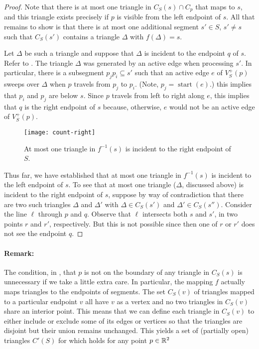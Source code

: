 \documentclass{patmorin}
\DeclareMathOperator{\start}{start}
\begin{document}
\begin{proof}
Note that there is at most one triangle in $C_S(s)\cap C_p$ that maps
to $s$, and this triangle exists precisely if $p$ is visible from the
left endpoint of $s$.  All that remains to show is that there is at
most one additional segment $s'\in S$, $s'\neq s$ such that $C_S(s')$
contains a triangle $\Delta$ with $f(\Delta)=s$.

Let $\Delta$ be such a triangle and suppose that $\Delta$ is incident to
the endpoint $q$ of $s$.  Refer to .  The triangle
$\Delta$ was generated by an active edge when processing $s'$.  In
particular, there is a subsegment $p_j p_i\subseteq s'$ such that an active
edge $e$ of $V^+_S(p)$ sweeps over $\Delta$ when $p$ travels from $p_j$ to
$p_i$. (Note, $p_j=\start(e)$.) this implies that $p_i$ and $p_j$ are below
$s$. Since $p$ travels from left to right along $e$, this implies that $q$
is the right endpoint of $s$ because, otherwise, $e$ would not be an active
edge of $V^+_S(p)$.

\begin{figure}
  \begin{center}
    \texttt{[image: count-right]}
  \end{center}
  \caption{At most one triangle in $f^{-1}(s)$ is incident to the right
           endpoint of $S$.}
\end{figure}

Thus far, we have established that at most one triangle in $f^{-1}(s)$ is
incident to the left endpoint of $s$.  To see that at most one triangle
($\Delta$, discussed above) is incident to the right endpoint of $s$,
suppose by way of contradiction that there are two such triangles $\Delta$
and $\Delta'$ with $\Delta\in C_S(s')$ and $\Delta'\in C_S(s'')$.
Consider the line $\ell$ through $p$ and $q$.  Observe that $\ell$
intersects both $s$ and $s'$, in two points $r$ and $r'$, respectively. But
this is not possible since then one of $r$ or $r'$ does not see the
endpoint $q$.
\end{proof}

\paragraph{Remark:}
The condition, in , that $p$ is not on the boundary of
any triangle in $C_S(s)$ is unnecessary if we take a little extra care.
In particular, the mapping $f$ actually maps triangles to the endpoints of
segments.  The set $C_S(v)$ of triangles mapped to a particular endpoint
$v$ all have $v$ as a vertex and no two triangles in $C_S(v)$ share an
interior point.  This means that we can define each triangle in $C_S(v)$
to either include or exclude some of its edges or vertices so that the
triangles are disjoint but their union remains unchanged. This yields
a set of (partially open) triangles $C'(S)$ for which 
holds for any point $p\in\mathbb{R}^2$
\end{document}
